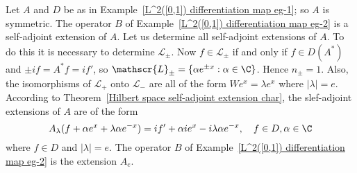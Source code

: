 \begin{example}
Let $A$ and $D$ be as in Example~\ref{L^2([0,1]) differentiation map eg-1}; so $A$ is symmetric. The operator $B$ of Example~\ref{L^2([0,1]) differentiation map eg-2} is a self-adjoint extension of $A$. Let us determine all self-adjoint extensions of $A$. To do this it is necessary to determine $\mathscr{L}_\pm$. Now $f\in\mathscr{L}_\pm$ if and only if $f\in D(A^*)$ and $\pm if=A^*f=if'$, so $\mathscr{L}_\pm=\{\alpha e^{\pm x}:\alpha\in\C\}$. Hence $n_\pm=1$. Also, the isomorphisms of $\mathscr{L}_+$ onto $\mathscr{L}_-$ are all of the form $We^x=\lambda e^x$ where $|\lambda|=e$. According to Theorem~\ref{Hilbert space self-adjoint extension char}, the slef-adjoint extensions of $A$ are of the form
\[A_\lambda(f+\alpha e^x+\lambda\alpha e^{-x})=if'+\alpha ie^x-i\lambda\alpha e^{-x},\quad f\in D,\alpha\in\C\]
where $f\in D$ and $|\lambda|=e$. The operator $B$ of Example~\ref{L^2([0,1]) differentiation map eg-2} is the extension $A_e$.
\end{example}
